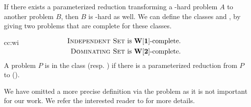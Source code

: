 If there exists a parameterized reduction transforming a \Wt-hard problem $A$ to another problem $B$, then $B$ is \Wt-hard as well.
We can define the classes \WONE and \WTWO, by giving two problems that are complete for these classes.

\begin{cc}{cc:wi}\begin{align*}
        \\[-2em] & \\[-3em]
        \text{\is is } &\text{\WONE-complete.}\\
        \text{\dom is } &\text{\WTWO-complete.}
    \end{align*}
    A problem $P$ is in the class \WONE (resp. \WTWO) if there is a parameterized reduction from $P$ to \is (\dom).
\end{cc}

We have omitted a more precise definition via the \wsat problem as it is not important for our work.
We refer the interested reader to \cite{Cygan2015, Fomin2019} for more details.

